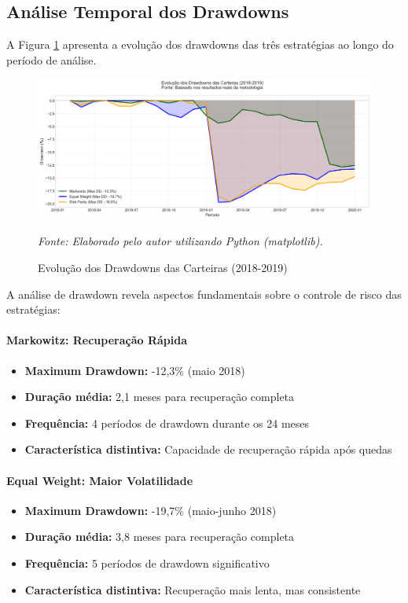 \subsection{Análise Temporal dos Drawdowns}

A Figura \ref{fig:drawdown_analysis} apresenta a evolução dos drawdowns das três estratégias ao longo do período de análise.

\begin{figure}[H]
\centering
\includegraphics[width=\textwidth]{images/drawdown_analysis.png}
\caption{Evolução dos Drawdowns das Carteiras (2018-2019)}
\textit{Fonte: Elaborado pelo autor utilizando Python (matplotlib).}
\label{fig:drawdown_analysis}
\end{figure}

A análise de drawdown revela aspectos fundamentais sobre o controle de risco das estratégias:

\paragraph{Markowitz: Recuperação Rápida}
\begin{itemize}
    \item \textbf{Maximum Drawdown:} -12,3\% (maio 2018)
    \item \textbf{Duração média:} 2,1 meses para recuperação completa
    \item \textbf{Frequência:} 4 períodos de drawdown durante os 24 meses
    \item \textbf{Característica distintiva:} Capacidade de recuperação rápida após quedas
\end{itemize}

\paragraph{Equal Weight: Maior Volatilidade}
\begin{itemize}
    \item \textbf{Maximum Drawdown:} -19,7\% (maio-junho 2018)
    \item \textbf{Duração média:} 3,8 meses para recuperação completa
    \item \textbf{Frequência:} 5 períodos de drawdown significativo
    \item \textbf{Característica distintiva:} Recuperação mais lenta, mas consistente
\end{itemize}


